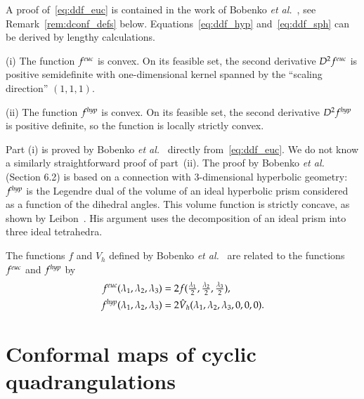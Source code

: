 \documentclass[Thesis]{subfiles}
\begin{document}
A proof of~\eqref{eq:ddf_euc} is contained in the work of Bobenko {\it et al.}\ 
\cite[Proposition 4.2.3]{BPS2015:dconf}, see Remark~\ref{rem:dconf_defs} below.
Equations~\eqref{eq:ddf_hyp} and~\eqref{eq:ddf_sph} can be derived by
lengthy calculations.

\begin{proposition}
  \label{prop:f_convex}
  (i) The function $f^{\euc}$ is convex. On its feasible set, the
  second derivative $D^{2}f^{\euc}$ is positive semidefinite with
  one-dimensional kernel spanned by the ``scaling direction''\/
  $(1,1,1)$. 

  (ii) The function $f^{\mathit{hyp}}$ is convex. On its feasible
  set, the second derivative $D^{2}f^{\mathit{hyp}}$ is positive definite, so
  the function is locally strictly convex.
\end{proposition}

Part (i) is proved by Bobenko {\it et al.}\ \cite[Propositions~4.2.4, 4.2.5,
note the following remark]{BPS2015:dconf}
directly from~\eqref{eq:ddf_euc}. We do not know a similarly
straightforward proof of part~(ii). The proof by Bobenko {\it et al.}
(Section 6.2) is based on a connection with 3-dimensional hyperbolic
geometry: $f^{\mathit{hyp}}$ is the Legendre dual of the volume of an ideal
hyperbolic prism considered as a function of the dihedral angles. This
volume function is strictly concave, as shown by
Leibon~\cite{leibon_2002}. His argument uses the decomposition of an
ideal prism into three ideal tetrahedra.

\begin{remark}
  \label{rem:dconf_defs}
  The functions $f$ and $\hat V_{h}$ defined by Bobenko {\it et al.}\ 
  \cite[Equations (4-3), (6-4)]{BPS2015:dconf} are related to the functions $f^{\euc}$ and
  $f^{\mathit{hyp}}$ by
  \begin{align}
    \label{eq:f_dconf}
    f^{\euc}(\lambda_{1},\lambda_{2},\lambda_{3})
    &=
    2f(\tfrac{\lambda_{1}}{2},
    \tfrac{\lambda_{2}}{2}, \tfrac{\lambda_{3}}{2}),\\
    f^{\hyp}(\lambda_{1},\lambda_{2},\lambda_{3})
    &=
    2\hat V_{h}(\lambda_{1},\lambda_{2},\lambda_{3},0,0,0).
  \end{align}

\end{remark}

\section{Conformal maps of cyclic quadrangulations}
\label{sec:quadrangulations}
\end{document}
